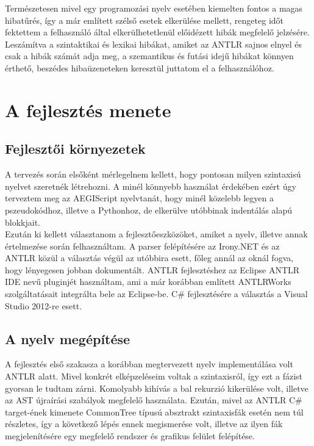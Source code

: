 \documentclass[a4paper,12pt]{report}
\begin{document}
Természetesen mivel egy programozási nyelv esetében kiemelten fontos a magas hibatűrés, így a már említett szélső esetek elkerülése mellett, rengeteg időt fektettem a felhasználó által elkerülhetetlenül előidézett hibák megfelelő jelzésére. Leszámítva a szintaktikai és lexikai hibákat, amiket az ANTLR\cite{antlr} sajnos elnyel és csak a hibák számát adja meg, a szemantikus és futási idejű hibákat könnyen érthető, beszédes hibaüzeneteken keresztül juttatom el a felhasználóhoz.

\section{A fejlesztés menete}
\subsection{Fejlesztői környezetek}
A tervezés során elsőként mérlegelnem kellett, hogy pontosan milyen szintaxisú nyelvet szeretnék létrehozni. A minél könnyebb használat érdekében ezért úgy terveztem meg az AEGIScript nyelvtanát, hogy minél közelebb legyen a pszeudokódhoz, illetve a Pythonhoz, de elkerülve utóbbinak indentálás alapú blokkjait. \\

Ezután ki kellett választanom a fejlesztőeszközöket, amiket a nyelv, illetve annak értelmezése során felhasználtam. A parser felépítésére az Irony.NET és az ANTLR közül a választás végül az utóbbira esett, főleg annál az oknál fogva, hogy lényegesen jobban dokumentált. ANTLR fejlesztéshez az Eclipse\cite{eclipse}  ANTLR IDE\cite{antlride} nevű pluginjét használtam, ami a már korábban említett ANTLRWorks szolgáltatásait integrálta bele az Eclipse-be. C\# fejlesztésére a választás a Visual Studio 2012-re esett.

\subsection{A nyelv megépítése}
A fejlesztés első szakasza a korábban megtervezett nyelv implementálása volt ANTLR alatt. Mivel konkrét elképzeléseim voltak a szintaxisról, így ezt a fázist gyorsan le tudtam zárni. Komolyabb kihívás a bal rekurzió kikerülése volt, illetve az AST újraírási szabályok megfelelő használata. Ezután, mivel az ANTLR C\# target-ének kimenete CommonTree típusú absztrakt szintaxisfák esetén nem túl részletes, így a következő lépés ennek megismerése volt, illetve az ilyen fák megjelenítésére egy megfelelő rendszer és grafikus felület felépítése.
\end{document}
